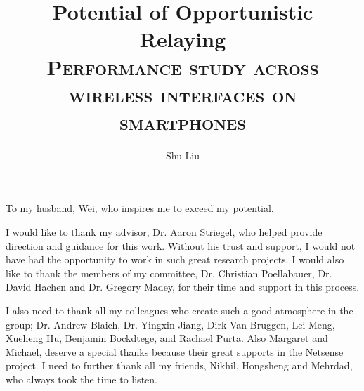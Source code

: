 \documentclass[textrefs,review]{nddiss2e}
\begin{document}
\frontmatter

\title{Potential of Opportunistic Relaying\\ {\small\scshape Performance study across wireless interfaces on smartphones} }
\author{Shu Liu}

\maketitle
%
%

\makecopyright

\begin{abstract}
\end{abstract}

\renewcommand{\dedicationname}{}

\begin{dedication}
  To my husband, Wei, who inspires me to exceed my potential. 
\end{dedication}

\tableofcontents
\listoffigures
\listoftables

\begin{preface}
\end{preface}

\begin{acknowledge}
I would like to thank my advisor, Dr. Aaron Striegel, who helped provide
direction and guidance for this work. Without his trust and support, I would not have had the opportunity to work in such great research projects. I would also like to thank the members of my committee, Dr. Christian Poellabauer, Dr. David Hachen and Dr. Gregory Madey, for their time and support in this process.

I also need to thank all my colleagues who create such a good atmosphere in the group;
Dr. Andrew Blaich, Dr. Yingxin Jiang, Dirk Van Bruggen, Lei Meng, Xueheng Hu, Benjamin Bockdtege, and Rachael Purta.  Also Margaret and Michael, deserve a special thanks because their great supports in the Netsense project. I need to further thank all my friends, Nikhil, Hongsheng and Mehrdad, who always took the time to listen. 
\end{acknowledge}
\end{document}
